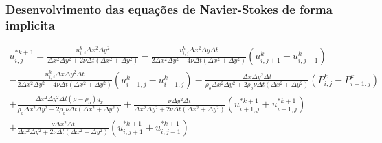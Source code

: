 \documentclass[xcolor=dvipsnames,10pt,aspectratio=169]{beamer}
\begin{document}
	\begin{frame}
		\frametitle{Desenvolvimento das equações de Navier-Stokes  de forma implicita}
		\begin{equation}
			\begin{split}
			u_{i , j}^{\ast k + 1} = \frac{u_{i , j}^{k} \Delta x ^2 \Delta y^2}{ \Delta x ^2 \Delta y^2 + 2 \nu \Delta t(\Delta x ^2 + \Delta y^2)} - \frac{ v_{i , j}^{k} \Delta x ^2 \Delta y \Delta t}{ 2 \Delta x ^2 \Delta y^2 + 4 \nu \Delta t(\Delta x ^2 + \Delta y^2)} \left( u_{i , j+ 1}^k - u_{i, j-1}^k   \right)  \\ - \frac{u_{i , j}^{k} \Delta x \Delta y^2 \Delta t}{ 2 \Delta x ^2 \Delta y^2 + 4 \nu \Delta t(\Delta x ^2 + \Delta y^2)} \left(u_{i + 1 , j}^k - u_{i - 1 , j}^k \right) - \frac{ \Delta x \Delta y^2 \Delta t}{ \rho_o \Delta x ^2 \Delta y^2 + 2 \rho_o \nu \Delta t(\Delta x ^2 + \Delta y^2)} (P_{i, j}^k - P_{i - 1 , j}^k ) \\ + \frac{ \Delta x ^2 \Delta y^2 \Delta t (\rho -\rho_o) g_x }{ \rho_o \Delta x ^2 \Delta y^2 + 2 \rho_o \nu \Delta t(\Delta x ^2 + \Delta y^2)} + \frac{ \nu \Delta y^2 {\Delta t}}{ \Delta x ^2 \Delta y^2 + 2 \nu \Delta t(\Delta x ^2 + \Delta y^2)} \left( u_{i+1 , j}^{\ast k + 1} + u_{i-1,j}^{\ast k + 1} \right) \\ + \frac{ \nu \Delta x^2 {\Delta t}}{ \Delta x ^2 \Delta y^2 + 2 \nu \Delta t(\Delta x ^2 + \Delta y^2)} \left( u_{i , j+1}^{\ast k + 1} + u_{i,j-1}^{\ast k + 1}\right)
			\end{split}
		\end{equation}
	
	\end{frame}
\end{document}
